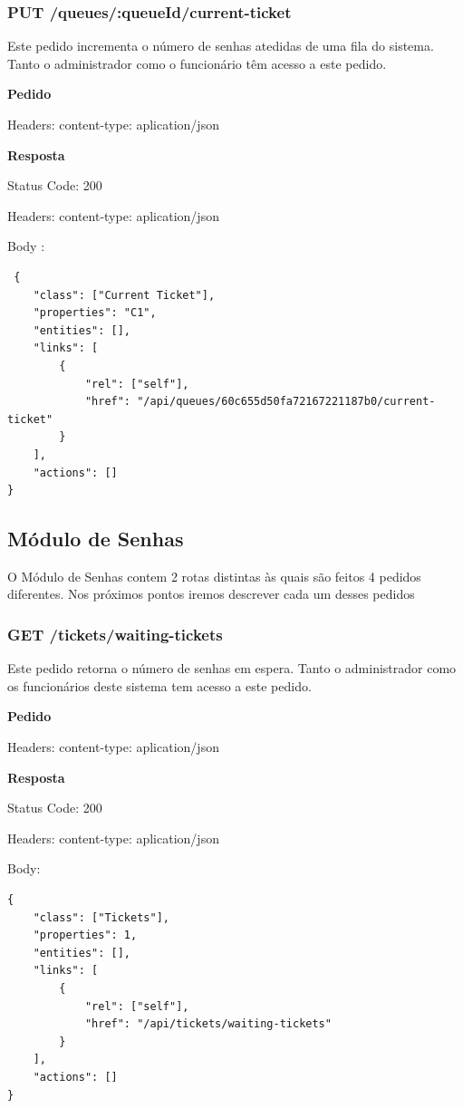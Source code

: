 \documentclass[12pt,a4paper]{article}
\begin{document}
\subsubsection{PUT /queues/:queueId/current-ticket}
Este pedido incrementa o número de senhas atedidas de uma fila do sistema. Tanto o administrador como o funcionário têm acesso a este pedido.\par
\vspace{0.5 cm}
\textbf{Pedido}\par
Headers: content-type: aplication/json\par
\vspace{0.5 cm}
\textbf{Resposta}\par
Status Code: 200\par                                                         
Headers: content-type: aplication/json\par
Body :
\begin{verbatim}
 {
    "class": ["Current Ticket"],
    "properties": "C1",
    "entities": [],
    "links": [         
        {
            "rel": ["self"],
            "href": "/api/queues/60c655d50fa72167221187b0/current-ticket"       
        }     
    ],
    "actions": []
}     
\end{verbatim}
\pagebreak

\subsection{Módulo de Senhas}
O Módulo de Senhas contem 2 rotas distintas às quais são feitos 4 pedidos diferentes. Nos próximos pontos 
iremos descrever cada um desses pedidos
\subsubsection{GET /tickets/waiting-tickets}
Este pedido retorna o número de senhas em espera. Tanto o administrador como os funcionários deste sistema tem acesso a este pedido.\par
\vspace{0.5 cm}
 \textbf{Pedido}\par
Headers: content-type: aplication/json\par
\vspace{0.5 cm}
\textbf{Resposta}\par
Status Code: 200 \par                           
Headers: content-type: aplication/json\par 
Body: 
\begin{verbatim}
{
    "class": ["Tickets"],
    "properties": 1,
    "entities": [],
    "links": [         
        {
            "rel": ["self"],
            "href": "/api/tickets/waiting-tickets"
        }
    ],
    "actions": []
}
\end{verbatim}
\pagebreak
\end{document}
